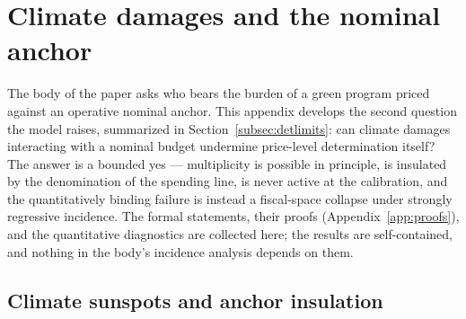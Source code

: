 \documentclass[12pt]{article}
\makeatletter
\newcommand{\FloatBarrier}{\par
    \begingroup\let\@elt\relax
    \edef\reserved@a{\@deferlist}\endgroup
    \ifx\reserved@a\@empty\else\clearpage\fi}
\makeatother
\begin{document}
\FloatBarrier

\section{Climate damages and the nominal anchor}\label{app:determinacy}
The body of the paper asks who bears the burden of a green program priced
against an operative nominal anchor. This appendix develops the second
question the model raises, summarized in Section~\ref{subsec:detlimits}:
can climate damages interacting with a nominal budget undermine price-level
determination itself? The answer is a bounded yes --- multiplicity is
possible in principle, is insulated by the denomination of the spending
line, is never active at the calibration, and the quantitatively binding
failure is instead a fiscal-space collapse under strongly regressive
incidence. The formal statements, their proofs (Appendix~\ref{app:proofs}),
and the quantitative diagnostics are collected here; the results are
self-contained, and nothing in the body's incidence analysis depends on
them.

\subsection{Climate sunspots and anchor insulation}
\end{document}
